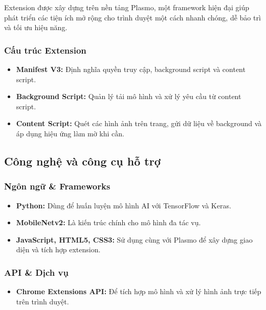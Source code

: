 \documentclass[12pt,a4paper]{article}
\begin{document}
Extension được xây dựng trên nền tảng Plasmo, một framework hiện đại giúp phát triển các tiện ích mở rộng cho trình duyệt một cách nhanh chóng, dễ bảo trì và tối ưu hiệu năng.

\subsubsection{Cấu trúc Extension}

\begin{itemize}
  \item \textbf{Manifest V3:} Định nghĩa quyền truy cập, background script và content script.
  
  \item \textbf{Background Script:} Quản lý tải mô hình và xử lý yêu cầu từ content script.
  
  \item \textbf{Content Script:} Quét các hình ảnh trên trang, gửi dữ liệu về background và áp dụng hiệu ứng làm mờ khi cần.
\end{itemize}

\subsection{Công nghệ và công cụ hỗ trợ}

\subsubsection{Ngôn ngữ \& Frameworks}

\begin{itemize}
  \item \textbf{Python:} Dùng để huấn luyện mô hình AI với TensorFlow và Keras.
  
  \item \textbf{MobileNetv2:} Là kiến trúc chính cho mô hình đa tác vụ.
  
  \item \textbf{JavaScript, HTML5, CSS3:} Sử dụng cùng với Plasmo để xây dựng giao diện và tích hợp extension.
\end{itemize}

\subsubsection{API \& Dịch vụ}

\begin{itemize}
  \item \textbf{Chrome Extensions API:} Để tích hợp mô hình và xử lý hình ảnh trực tiếp trên trình duyệt.
\end{itemize}
\end{document}
